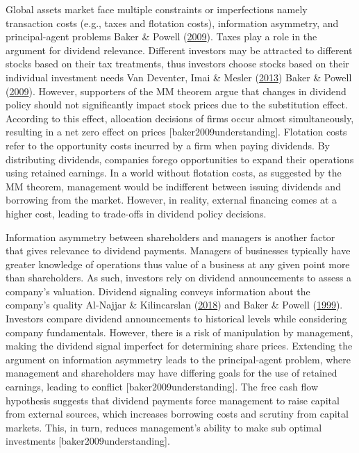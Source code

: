 \documentclass[11pt,preprint, authoryear]{elsarticle}
\numberwithin{equation}{section}
\numberwithin{figure}{section}
\numberwithin{table}{section}
\begin{document}
Global assets market face multiple constraints or imperfections namely
transaction costs (e.g., taxes and flotation costs), information
asymmetry, and principal-agent problems Baker \& Powell
(\protect\hyperlink{ref-baker2009understanding}{2009}). Taxes play a
role in the argument for dividend relevance. Different investors may be
attracted to different stocks based on their tax treatments, thus
investors choose stocks based on their individual investment needs Van
Deventer, Imai \& Mesler (\protect\hyperlink{ref-van2013advanced}{2013})
Baker \& Powell (\protect\hyperlink{ref-baker2009understanding}{2009}).
However, supporters of the MM theorem argue that changes in dividend
policy should not significantly impact stock prices due to the
substitution effect. According to this effect, allocation decisions of
firms occur almost simultaneously, resulting in a net zero effect on
prices {[}baker2009understanding{]}. Flotation costs refer to the
opportunity costs incurred by a firm when paying dividends. By
distributing dividends, companies forego opportunities to expand their
operations using retained earnings. In a world without flotation costs,
as suggested by the MM theorem, management would be indifferent between
issuing dividends and borrowing from the market. However, in reality,
external financing comes at a higher cost, leading to trade-offs in
dividend policy decisions.

Information asymmetry between shareholders and managers is another
factor that gives relevance to dividend payments. Managers of businesses
typically have greater knowledge of operations thus value of a business
at any given point more than shareholders. As such, investors rely on
dividend announcements to assess a company's valuation. Dividend
signaling conveys information about the company's quality Al-Najjar \&
Kilincarslan (\protect\hyperlink{ref-al2018revisiting}{2018}) and Baker
\& Powell (\protect\hyperlink{ref-baker1999corporate}{1999}). Investors
compare dividend announcements to historical levels while considering
company fundamentals. However, there is a risk of manipulation by
management, making the dividend signal imperfect for determining share
prices. Extending the argument on information asymmetry leads to the
principal-agent problem, where management and shareholders may have
differing goals for the use of retained earnings, leading to conflict
{[}baker2009understanding{]}. The free cash flow hypothesis suggests
that dividend payments force management to raise capital from external
sources, which increases borrowing costs and scrutiny from capital
markets. This, in turn, reduces management's ability to make sub optimal
investments {[}baker2009understanding{]}.
\end{document}
